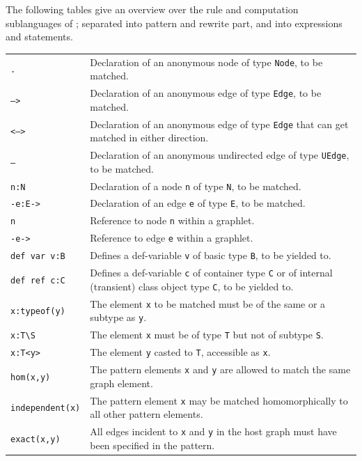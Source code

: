 The following tables give an overview over the rule and computation sublanguages of \GrG;
separated into pattern and rewrite part, and into expressions and statements.

\begin{table}[htbp]
\begin{minipage}{\linewidth} \renewcommand{\footnoterule}{} 
\begin{tabularx}{\linewidth}{|lX|}
\hline
\texttt{.}	& Declaration of an anonymous node of type \texttt{Node}, to be matched. \\
\texttt{-->}	& Declaration of an anonymous edge of type \texttt{Edge}, to be matched. \\
\texttt{<-->}	& Declaration of an anonymous edge of type \texttt{Edge} that can get matched in either direction. \\
\texttt{--}	& Declaration of an anonymous undirected edge of type \texttt{UEdge}, to be matched. \\
\texttt{n:N} & Declaration of a node \texttt{n} of type \texttt{N}, to be matched.\\
\texttt{-e:E->} & Declaration of an edge \texttt{e} of type \texttt{E}, to be matched.\\
\texttt{n} & Reference to node \texttt{n} within a graphlet.\\
\texttt{-e->} & Reference to edge \texttt{e} within a graphlet.\\
\texttt{def var v:B}	& Defines a def-variable \texttt{v} of basic type \texttt{B}, to be yielded to.\\
\texttt{def ref c:C}	& Defines a def-variable \texttt{c} of container type \texttt{C} or of internal (transient) class object type \texttt{C}, to be yielded to.\\
\hline
\texttt{x:typeof(y)} & The element \texttt{x} to be matched must be of the same or a subtype as \texttt{y}.\\
\texttt{x:T{\textbackslash}S} & The element \texttt{x} must be of type \texttt{T} but not of subtype \texttt{S}.\\
\texttt{x:T<y>} & The element \texttt{y} casted to \texttt{T}, accessible as \texttt{x}.\\
\hline
\texttt{hom(x,y)} & The pattern elements \texttt{x} and \texttt{y} are allowed to match the same graph element.\\
\texttt{independent(x)} & The pattern element \texttt{x} may be matched homomorphically to all other pattern elements.\\
\texttt{exact(x,y)} & All edges incident to \texttt{x} and \texttt{y} in the host graph must have been specified in the pattern.\\

\end{tabularx}
\end{minipage}
\end{table}
